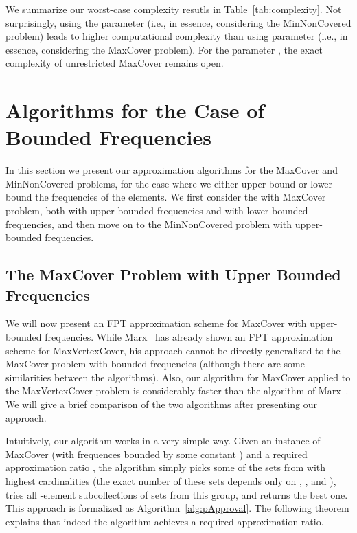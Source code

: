\documentclass[11pt]{article}
\begin{document}
We summarize our worst-case complexity resutls in
Table~\ref{tab:complexity}. Not surprisingly, using the parameter 
(i.e., in essence, considering the MinNonCovered problem) leads to
higher computational complexity than using parameter  (i.e., in
essence, considering the MaxCover problem). For the parameter , the
exact complexity of unrestricted MaxCover remains open.




\section{Algorithms for the Case of Bounded Frequencies}\label{sec:approximation}

In this section we present our approximation algorithms for the
MaxCover and MinNonCovered problems, for the case where we either
upper-bound or lower-bound the frequencies of the elements. We first
consider the with MaxCover problem, both with upper-bounded
frequencies and with lower-bounded frequencies, and then move on to
the MinNonCovered problem with upper-bounded frequencies.




\subsection{The MaxCover Problem with Upper Bounded Frequencies}

We will now present an FPT approximation scheme for MaxCover with
upper-bounded frequencies. While
Marx~\cite{Marx06parameterizedcomplexity} has already shown an FPT
approximation scheme for MaxVertexCover, his approach cannot be
directly generalized to the MaxCover problem with bounded frequencies
(although there are some similarities between the algorithms).
Also, our algorithm for MaxCover applied to the MaxVertexCover problem
is considerably faster than the algorithm of Marx~\cite{Marx06parameterizedcomplexity}.
We will give a brief comparison of the two algorithms after presenting our approach.


Intuitively, our algorithm works in a very simple way. Given an
instance  of MaxCover (with frequences bounded by
some constant ) and a required approximation ratio , the
algorithm simply picks some of the sets from  with highest
cardinalities (the exact number of these sets depends only on , , and
), tries all -element subcollections of sets from this
group, and returns the best one. This approach is formalized as
Algorithm~\ref{alg:pApproval}. The following theorem explains that
indeed the algorithm achieves a required approximation ratio.
\end{document}
